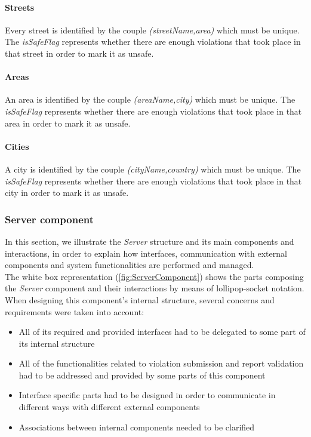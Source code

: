 \paragraph{Streets} Every street is identified by the couple \emph{(streetName,area)} which must be unique. The \emph{isSafeFlag} represents whether there are enough violations that took place in that street in order to mark it as unsafe.

\paragraph{Areas} An area is identified by the couple \emph{(areaName,city)} which must be unique. The \emph{isSafeFlag} represents whether there are enough violations that took place in that area in order to mark it as unsafe.

\paragraph{Cities} A city is identified by the couple \emph{(cityName,country)} which must be unique. The \emph{isSafeFlag} represents whether there are enough violations that took place in that city in order to mark it as unsafe.
\clearpage
\subsubsection{Server component}
In this section, we illustrate the \emph{Server} structure and its main components and interactions, in order to explain how interfaces, communication with external components and system functionalities are performed and managed.
\\

The white box representation (\autoref{fig:ServerComponent}) shows the parts composing the \emph{Server} component and their interactions by means of lollipop-socket notation. When designing this component's internal structure, several concerns and requirements were taken into account:
\begin{itemize}
	\item All of its required and provided interfaces had to be delegated to some part of its internal structure
	\item All of the functionalities related to violation submission and report validation had to be addressed and provided by some parts of this component
	\item Interface specific parts had to be designed in order to communicate in different ways with different external components
	\item Associations between internal components needed to be clarified
\end{itemize}

